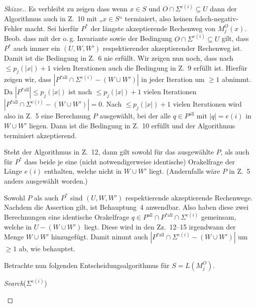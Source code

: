 \documentclass[nofonts]{uebung}
\begin{document}
\begin{proof}[Skizze.]
    Es verbleibt zu zeigen dass wenn $x\in S$ und  $O\cap \Sigma^{e(i)}\subseteq U$ dann der Algorithmus auch in Z.~10 mit „$x\in S$“ terminiert, also keinen falsch-negativ-Fehler macht.
    Sei hierfür $P^*$ der längste akzeptierende Rechenweg von $M_j^O(x)$.
    Beob. dass mit der o.\,g. Invariante sowie der Bedingung $O\cap\Sigma^{e(i)}\subseteq U$ gilt, dass $P^*$ auch immer ein $(U,W,W')$ respektierender akzeptierender Rechenweg ist.
    Damit ist die Bedingung in Z.~6 nie erfüllt.
    Wir zeigen nun noch, dass nach $\leq p_j(|x|)+1$ vielen Iterationen auch die Bedingung in Z.~9 erfüllt ist.
    Hierfür zeigen wir, dass $|P^{*\mathrm{all}}\cap \Sigma^{e(i)}-(W\cup W')|$ in jeder Iteration um $\geq 1$ abnimmt. Da $|P^{*\mathrm{all}}|\leq p_j(|x|)$ ist nach $\leq p_j(|x|)+1$ vielen Iterationen $|P^{*\mathrm{all}}\cap \Sigma^{e(i)}-(W\cup W')|=0$.
    Nach $\leq p_j(|x|)+1$ vielen Iterationen wird also in Z.~5 eine Berechnung $P$ ausgewählt, bei der alle $q\in P^{\mathrm{all}}$ mit $|q|=e(i)$ in $W\cup W'$ liegen. Dann ist die Bedingung in Z.~10 erfüllt und der Algorithmus terminiert akzeptierend.

    Steht der Algorithmus in Z.~12, dann gilt sowohl für das ausgewählte $P$, als auch für $P^*$ dass beide je eine (nicht notwendigerweise identische) Orakelfrage der Länge $e(i)$ enthalten, welche nicht in $W\cup W'$ liegt. (Andernfalls  wäre $P$ in Z.~5 anders ausgewählt worden.)

    Sowohl $P$ als auch $P^*$ sind $(U, W, W')$ respektierende akzeptierende Rechenwege. Nachdem die Assertion gilt, ist Behauptung~4 anwendbar. Also haben diese zwei Berechnungen eine identische Orakelfrage $q\in P^\mathrm{all}\cap P^{*\mathrm{all}}\cap \Sigma^{e(i)}$ gemeinsam, welche in $U-(W\cup W')$ liegt.
    Diese wird in den Zz.~12--15 irgendwann der Menge $W\cup W'$ hinzugefügt.
    Damit nimmt auch $|P^{*\mathrm{all}}\cap \Sigma^{e(i)}-(W\cup W')|$ um $\geq 1$ ab, wie behauptet.
    \medskip

    Betrachte nun folgenden Entscheidungsalgorithmus für $S=L(M_j^O)$.

    \noindent
    \begin{algorithm}[H]
        \setcounter{AlgoLine}{17}
        {
            {
            }
            {
            }
        }
        {
            \Return \emph{Search}($\Sigma^{e(i)}$)\;
        }
        \medskip
    \end{algorithm}


\end{proof}
\end{document}
